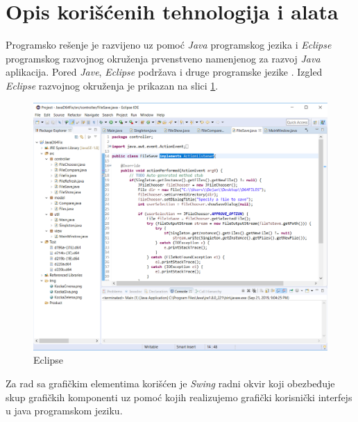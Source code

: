 \section{Opis korišćenih tehnologija i alata}

Programsko rešenje je razvijeno uz pomoć \textit{Java} programskog jezika i  \textit{Eclipse} programskog razvojnog okruženja prvenstveno namenjenog za razvoj \textit{Java} aplikacija. Pored \textit{Jave}, \textit{Eclipse} podržava i druge programske jezike \cite{Eclipse}. Izgled \textit{Eclipse} razvojnog okruženja je prikazan na slici \ref{img:eclipse}.

\begin{figure}[ht]
\begin{center}
\includegraphics[width=\textwidth]{img/EclipseIDE.png}
\caption{Eclipse}
\label{img:eclipse}
\end{center}
\end{figure}

Za rad sa grafičkim elementima korišćen je \textit{Swing} radni okvir koji obezbeđuje skup grafičkih komponenti uz pomoć kojih realizujemo grafički korisnički interfejs u java programskom jeziku.